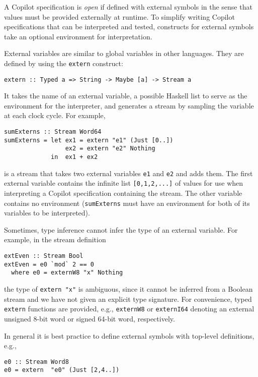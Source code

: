  A Copilot specification is \emph{open} if defined with external symbols in the
sense that values must be provided externally at runtime.  To simplify writing
Copilot specifications that can be interpreted and tested, constructs for
external symbols take an optional environment for interpretation.

External variables are similar to global variables in other languages. They
are defined by using the {\tt extern} construct:
%
\begin{lstlisting}[language = Copilot, frame = single]
extern :: Typed a => String -> Maybe [a] -> Stream a
\end{lstlisting}
%
\noindent
It takes the name of an external variable, a possible Haskell list to serve as
the environment for the interpreter, and generates a stream by sampling the
variable at each clock cycle.  For example,
%
\begin{lstlisting}[language = Copilot, frame = single]
sumExterns :: Stream Word64
sumExterns = let ex1 = extern "e1" (Just [0..])
                 ex2 = extern "e2" Nothing
             in  ex1 + ex2
\end{lstlisting}
%
is a stream that takes two external variables {\tt e1} and {\tt e2} and adds
them.  The first external variable contains the infinite list {\tt [0,1,2,...]}
of values for use when interpreting a Copilot specification containing the
stream.  The other variable contains no environment ({\tt sumExterns} must have
an environment for both of its variables to be interpreted).

Sometimes, type inference cannot infer the type of an external variable.  For
example, in the stream definition
%
\begin{lstlisting}[language = Copilot, frame = single]
extEven :: Stream Bool
extEven = e0 `mod` 2 == 0
  where e0 = externW8 "x" Nothing
\end{lstlisting}
%
\noindent
the type of {\tt extern "x"} is ambiguous, since it cannot be inferred from a
Boolean stream and we have not given an explicit type signature.  For
convenience, typed {\tt extern} functions are provided, e.g., {\tt externW8} or
{\tt externI64} denoting an external unsigned 8-bit word or signed 64-bit word,
respectively.

In general it is best practice to define external symbols with
top-level definitions, e.g.,
%
\begin{lstlisting}[language = Copilot, frame = single]
e0 :: Stream Word8
e0 = extern  "e0" (Just [2,4..])
\end{lstlisting}

